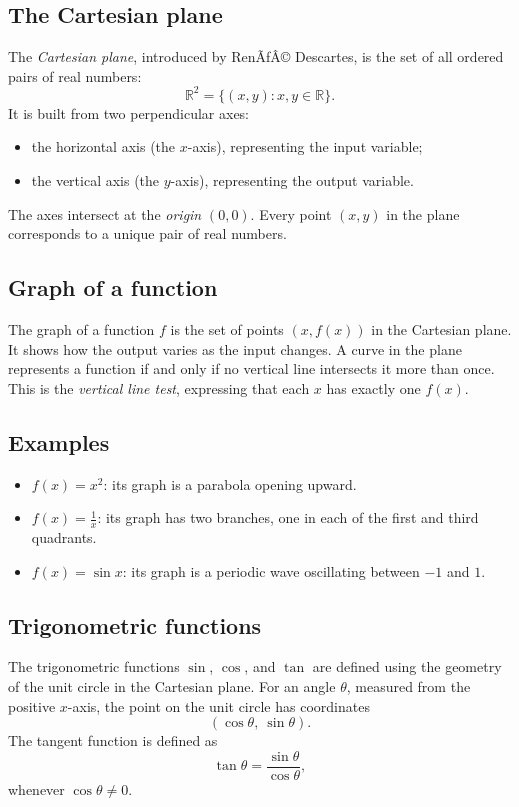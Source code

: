 \documentclass[11pt,a4paper]{article}
\theoremstyle{definition} \newtheorem{definition}{Definition} \theoremstyle{plain} \newtheorem{theorem}{Theorem}
\begin{document}
\subsection{The Cartesian plane}
The \emph{Cartesian plane}, introduced by RenÃƒÂ© Descartes, is the set of all ordered pairs of real numbers:
\[ \mathbb{R}^2 = \{(x,y) : x,y\in\mathbb{R}\}. \]
It is built from two perpendicular axes: \begin{itemize}
\item the horizontal axis (the $x$-axis), representing the input variable;
\item the vertical axis (the $y$-axis), representing the output variable. \end{itemize}
The axes intersect at the \emph{origin} $(0,0)$.
Every point $(x,y)$ in the plane corresponds to a unique pair of real numbers.
\subsection{Graph of a function}
The graph of a function $f$ is the set of points $(x,f(x))$ in the Cartesian plane.
It shows how the output varies as the input changes.
A curve in the plane represents a function if and only if no vertical line intersects it more than once.
This is the \emph{vertical line test}, expressing that each $x$ has exactly one $f(x)$.
\subsection*{Examples}
\begin{itemize}
\item $f(x)=x^2$: its graph is a parabola opening upward.
\item $f(x)=\frac{1}{x}$: its graph has two branches, one in each of the first and third quadrants.
\item $f(x)=\sin x$: its graph is a periodic wave oscillating between $-1$ and $1$. \end{itemize}
\subsection{Trigonometric functions}
The trigonometric functions $\sin$, $\cos$, and $\tan$ are defined using the geometry of the unit circle in the Cartesian plane.
For an angle $\theta$, measured from the positive $x$-axis, the point on the unit circle has coordinates
\[ (\cos\theta,\ \sin\theta). \]
The tangent function is defined as
\[ \tan\theta = \frac{\sin\theta}{\cos\theta}, \]
whenever $\cos\theta \neq 0$.
\end{document}
